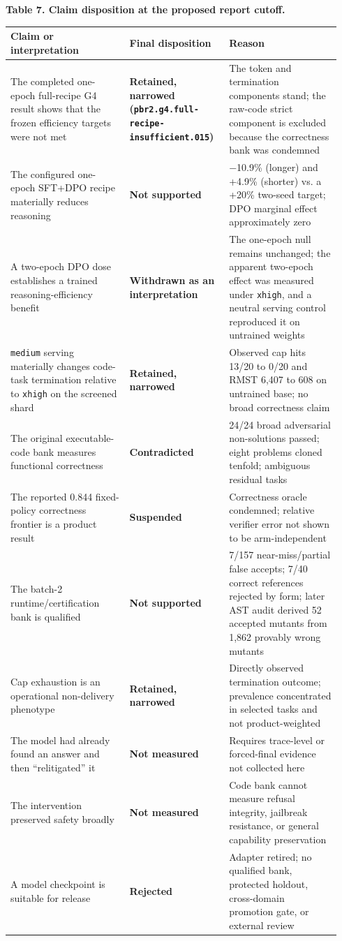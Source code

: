 \documentclass[
  9pt,
  letterpaper,
]{article}
\begin{document}
\textbf{Table 7. Claim disposition at the proposed report cutoff.}

\begin{longtable}[]{@{}p{0.34\linewidth}p{0.28\linewidth}p{0.32\linewidth}@{}}
\toprule\noalign{}
Claim or interpretation & Final disposition & Reason \\
\midrule\noalign{}
\endhead
\bottomrule\noalign{}
\endlastfoot
The completed one-epoch full-recipe G4 result shows that the frozen
efficiency targets were not met & \textbf{Retained, narrowed
(\texttt{pbr2.g4.full-recipe-insufficient.015})} & The token and
termination components stand; the raw-code strict component is excluded
because the correctness bank was condemned \\
The configured one-epoch SFT+DPO recipe materially reduces reasoning &
\textbf{Not supported} & −10.9\% (longer) and +4.9\% (shorter) vs. a
+20\% two-seed target; DPO marginal effect approximately zero \\
A two-epoch DPO dose establishes a trained reasoning-efficiency benefit
& \textbf{Withdrawn as an interpretation} & The one-epoch null remains
unchanged; the apparent two-epoch effect was measured under
\texttt{xhigh}, and a neutral serving control reproduced it on untrained
weights \\
\texttt{medium} serving materially changes code-task termination
relative to \texttt{xhigh} on the screened shard & \textbf{Retained,
narrowed} & Observed cap hits 13/20 to 0/20 and RMST 6,407 to 608 on
untrained base; no broad correctness claim \\
The original executable-code bank measures functional correctness &
\textbf{Contradicted} & 24/24 broad adversarial non-solutions passed;
eight problems cloned tenfold; ambiguous residual tasks \\
The reported 0.844 fixed-policy correctness frontier is a product result
& \textbf{Suspended} & Correctness oracle condemned; relative verifier
error not shown to be arm-independent \\
The batch-2 runtime/certification bank is qualified & \textbf{Not
supported} & 7/157 near-miss/partial false accepts; 7/40 correct
references rejected by form; later AST audit derived 52 accepted mutants
from 1,862 provably wrong mutants \\
Cap exhaustion is an operational non-delivery phenotype &
\textbf{Retained, narrowed} & Directly observed termination outcome;
prevalence concentrated in selected tasks and not product-weighted \\
The model had already found an answer and then ``relitigated'' it &
\textbf{Not measured} & Requires trace-level or forced-final evidence
not collected here \\
The intervention preserved safety broadly & \textbf{Not measured} & Code
bank cannot measure refusal integrity, jailbreak resistance, or general
capability preservation \\
A model checkpoint is suitable for release & \textbf{Rejected} & Adapter
retired; no qualified bank, protected holdout, cross-domain promotion
gate, or external review \\
\end{longtable}
\end{document}
